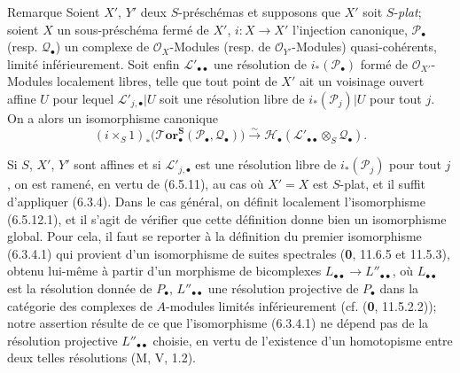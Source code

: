 \begin{namedtheorem}[6.5.12]{Remarque}
Soient $X'$, $Y'$ deux $S$-préschémas et supposons que $X'$ soit $S$-\emph{plat};
soient $X$ un sous-préschéma fermé de $X'$, $i:X\to X'$ l'injection canonique,
$\mathscr P_\bullet$ (resp. $\mathscr Q_\bullet$) un complexe de
$\mathscr O_X$-Modules (resp. de $\mathscr O_{Y'}$-Modules) quasi-cohérents,
limité inférieurement. Soit enfin $\mathscr L'_{\bullet\bullet}$ une résolution
de $i_*(\mathscr P_\bullet)$ formé de $\mathscr O_{X'}$-Modules localement
libres, telle que tout point de $X'$ ait un voisinage ouvert affine $U$ pour
lequel $\mathscr L'_{j,\bullet}|U$ soit une résolution libre de
$i_*(\mathscr P_j)|U$ pour tout $j$. On a alors un isomorphisme canonique
\[
  (i\times_S 1)_*
  \bigl(\boldsymbol{\mathscr{T}\!or}_\bullet^{\mathbf S}
    (\mathscr P_\bullet,\mathscr Q_\bullet)\bigr)
  \xrightarrow{\sim}
  \mathscr H_\bullet
  (\mathscr L'_{\bullet\bullet}\otimes_S\mathscr Q_\bullet).
  \tag{6.5.12.1}\label{III.6.5.12.1.fr}
\]

Si $S$, $X'$, $Y'$ sont affines et si $\mathscr L'_{j,\bullet}$ est une
résolution libre de $i_*(\mathscr P_j)$ pour tout $j$, on est ramené, en vertu
de (6.5.11), au cas où $X'=X$ est $S$-plat, et il suffit d'appliquer (6.3.4).
Dans le cas général, on définit localement l'isomorphisme (6.5.12.1), et il
s'agit de vérifier que cette définition donne bien un isomorphisme global.
Pour cela, il faut se reporter à la définition du premier isomorphisme
(6.3.4.1) qui provient d'un isomorphisme de suites spectrales (\textbf{0}, 11.6.5 et
11.5.3), obtenu lui-même à partir d'un morphisme de bicomplexes
$L_{\bullet\bullet}\to L''_{\bullet\bullet}$, où $L_{\bullet\bullet}$ est la
résolution donnée de $P_\bullet$, $L''_{\bullet\bullet}$ une résolution
projective de $P_\bullet$ dans la catégorie des complexes de $A$-modules
limités
inférieurement (cf. (\textbf{0}, 11.5.2.2)); notre assertion résulte de ce que
l'isomorphisme (6.3.4.1) ne dépend pas de la résolution projective
$L''_{\bullet\bullet}$ choisie, en vertu de l'existence d'un homotopisme entre
deux telles résolutions (M, V, 1.2).
\end{namedtheorem}

